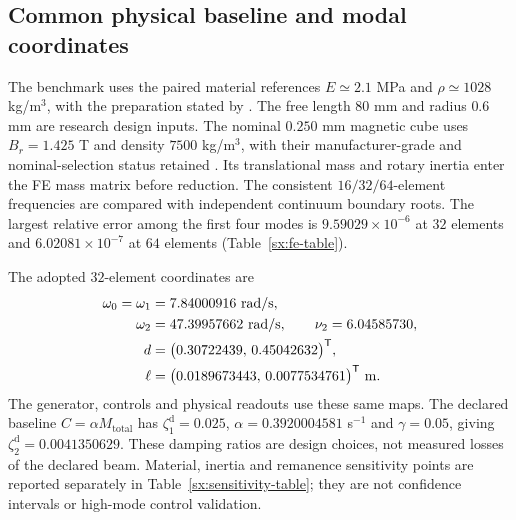 \subsection{Common physical baseline and modal coordinates}
\label{num:fe}
The benchmark uses the paired material references $E\simeq2.1$ MPa and
$\rho\simeq1028$ kg/m$^3$, with the preparation stated by
\citet{cho2021pdms}. The free length $80$ mm and radius $0.6$ mm are
research design inputs. The nominal $0.250$ mm magnetic cube uses
$B_r=1.425$ T and density $7500$ kg/m$^3$, with their manufacturer-grade
and nominal-selection status retained \citep{smN50,kjMoment}.
Its translational mass and rotary inertia enter the FE mass matrix before
reduction. The consistent $16/32/64$-element frequencies are compared
with independent continuum boundary roots. The largest relative error
among the first four modes is $9.59029\times10^{-6}$ at $32$ elements and
$6.02081\times10^{-7}$ at $64$ elements (Table~\ref{sx:fe-table}).

The adopted $32$-element coordinates are
\begin{align}
 \omega_0=\omega_1&=7.84000916\ \mathrm{rad/s},\notag\\
 \omega_2&=47.39957662\ \mathrm{rad/s},\qquad
 \nu_2=6.04585730,\notag\\
 d&=\bigl(0.30722439,\,0.45042632\bigr)^{\mathsf T},\notag\\
 \ell&=\bigl(0.0189673443,\,0.0077534761\bigr)^{\mathsf T}\ \mathrm m.
 \label{num:scales}
\end{align}
The generator, controls and physical readouts use these same maps.
The declared baseline $C=\alpha M_{\mathrm{total}}$ has
$\zeta_1^{\mathrm d}=0.025$, $\alpha=0.3920004581$ s$^{-1}$ and
$\gamma=0.05$, giving $\zeta_2^{\mathrm d}=0.0041350629$.
These damping ratios are design choices, not measured losses of the
declared beam. Material, inertia and remanence sensitivity points are
reported separately in Table~\ref{sx:sensitivity-table}; they are not
confidence intervals or high-mode control validation.

